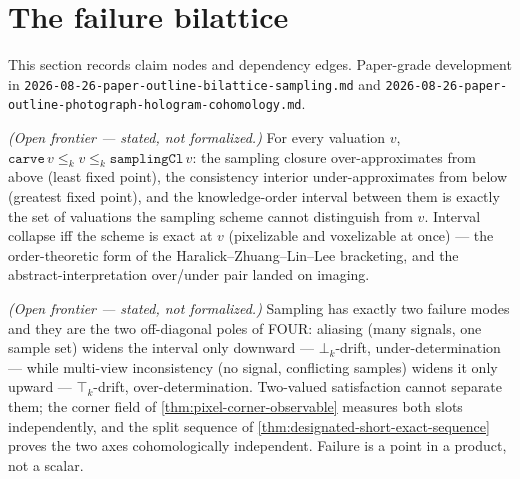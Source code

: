 \section{The failure bilattice}

This section records claim nodes and dependency edges. Paper-grade development in
\texttt{2026-08-26-paper-outline-bilattice-sampling.md} and
\texttt{2026-08-26-paper-outline-photograph-hologram-cohomology.md}.

\begin{theorem}\label{thm:reconstruction-interval}\notready{}
\emph{(Open frontier --- stated, not formalized.)} For every valuation $v$,
$\texttt{carve}\,v \le_k v \le_k \texttt{samplingCl}\,v$: the sampling closure
over-approximates from above (least fixed point), the consistency interior
under-approximates from below (greatest fixed point), and the knowledge-order interval
between them is exactly the set of valuations the sampling scheme cannot distinguish
from $v$. Interval collapse iff the scheme is exact at $v$ (pixelizable and voxelizable
at once) --- the order-theoretic form of the Haralick--Zhuang--Lin--Lee bracketing, and
the abstract-interpretation over/under pair landed on imaging.
\end{theorem}

\begin{theorem}\label{thm:sampling-failure-bilattice}\notready{}
\emph{(Open frontier --- stated, not formalized.)} Sampling has exactly two failure
modes and they are the two off-diagonal poles of FOUR: aliasing (many signals, one
sample set) widens the interval only downward --- $\bot_k$-drift, under-determination
--- while multi-view inconsistency (no signal, conflicting samples) widens it only
upward --- $\top_k$-drift, over-determination. Two-valued satisfaction cannot separate
them; the corner field of \cref{thm:pixel-corner-observable} measures both slots
independently, and the split sequence of \cref{thm:designated-short-exact-sequence}
proves the two axes cohomologically independent. Failure is a point in a product, not a
scalar.
\end{theorem}

